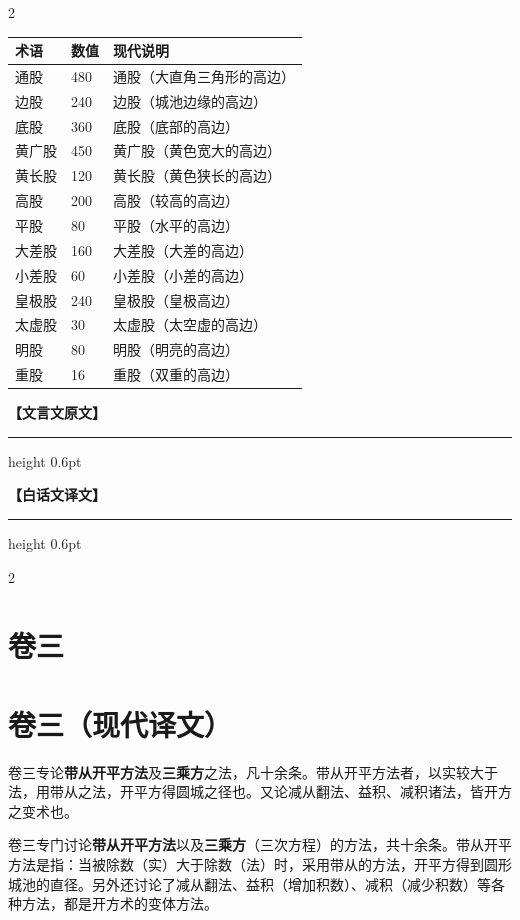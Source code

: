 \documentclass[11pt,a4paper]{article}
\newcommand{\colheaders}{%
  \noindent\begin{minipage}[t]{0.48\textwidth}\centering
    \textbf{\color{classicalframe}【文言文原文】}
    \vspace{0.3em}
    \hrule height 0.6pt
  \end{minipage}%
  \hfill
  \begin{minipage}[t]{0.48\textwidth}\centering
    \textbf{\color{modernframe}【白话文译文】}
    \vspace{0.3em}
    \hrule height 0.6pt
  \end{minipage}
  \par\medskip
}
\begin{document}
\begin{paracol}{2}
\begin{center}
\begin{tabular}{|l|l|p{4.5cm}|}
\hline
\textbf{术语} & \textbf{数值} & \textbf{现代说明} \\
\hline
通股 & 480 & 通股（大直角三角形的高边） \\
\hline
边股 & 240 & 边股（城池边缘的高边） \\
\hline
底股 & 360 & 底股（底部的高边） \\
\hline
黄广股 & 450 & 黄广股（黄色宽大的高边） \\
\hline
黄长股 & 120 & 黄长股（黄色狭长的高边） \\
\hline
高股 & 200 & 高股（较高的高边） \\
\hline
平股 & 80 & 平股（水平的高边） \\
\hline
大差股 & 160 & 大差股（大差的高边） \\
\hline
小差股 & 60 & 小差股（小差的高边） \\
\hline
皇极股 & 240 & 皇极股（皇极高边） \\
\hline
太虚股 & 30 & 太虚股（太空虚的高边） \\
\hline
明股 & 80 & 明股（明亮的高边） \\
\hline
重股 & 16 & 重股（双重的高边） \\
\hline
\end{tabular}
\end{center}

\switchcolumn*

\end{paracol}
\clearpage
\colheaders
\begin{paracol}{2}

\section{卷三}

\switchcolumn
\section*{卷三（现代译文）}

\switchcolumn*

卷三专论\textbf{带从开平方法}及\textbf{三乘方}之法，凡十余条。带从开平方法者，以实较大于法，用带从之法，开平方得圆城之径也。又论减从翻法、益积、减积诸法，皆开方之变术也。

\switchcolumn

卷三专门讨论\textbf{带从开平方法}以及\textbf{三乘方}（三次方程）的方法，共十余条。带从开平方法是指：当被除数（实）大于除数（法）时，采用带从的方法，开平方得到圆形城池的直径。另外还讨论了减从翻法、益积（增加积数）、减积（减少积数）等各种方法，都是开方术的变体方法。

\switchcolumn*

\end{paracol}
\end{document}

